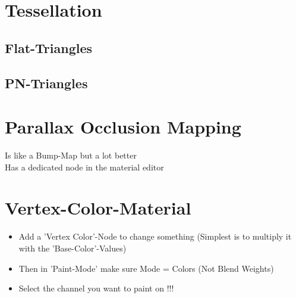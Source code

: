         
    \section{Tessellation}
        \subsection{Flat-Triangles}

        \subsection{PN-Triangles}

    \section{Parallax Occlusion Mapping}
        Is like a Bump-Map but a lot better \\
        Has a dedicated node in the material editor \\


    \section{Vertex-Color-Material}
        \begin{itemize}
            \item Add a 'Vertex Color'-Node to change something (Simplest is to multiply it with the 'Base-Color'-Values)
            \item Then in 'Paint-Mode' make sure Mode = Colors (Not Blend Weights)
            \item Select the channel you want to paint on !!!
        \end{itemize}

    
